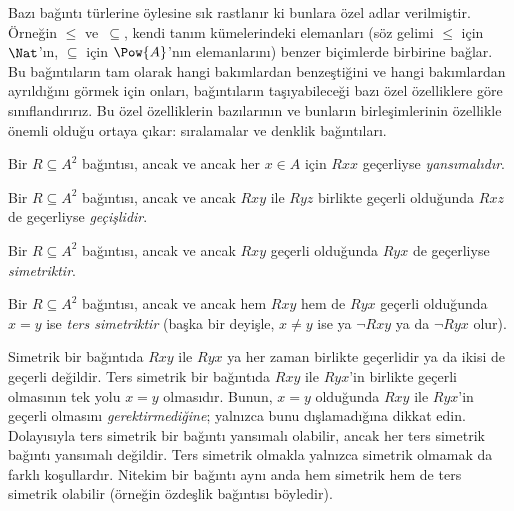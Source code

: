 \documentclass[../../../include/open-logic-section]{subfiles}
\begin{document}

\begin{intro}
Bazı bağıntı türlerine öylesine sık rastlanır ki bunlara özel adlar verilmiştir.
Örneğin $\le$ ve~$\subseteq$, kendi tanım kümelerindeki elemanları (söz gelimi
$\le$ için $\Nat$'ın, $\subseteq$ için $\Pow{A}$'nın elemanlarını) benzer
biçimlerde birbirine bağlar. Bu bağıntıların tam olarak hangi bakımlardan
benzeştiğini ve hangi bakımlardan ayrıldığını görmek için onları, bağıntıların
taşıyabileceği bazı özel özelliklere göre sınıflandırırız. Bu özel özelliklerin
bazılarının ve bunların birleşimlerinin özellikle önemli olduğu ortaya çıkar:
sıralamalar ve denklik bağıntıları.
\end{intro}

\begin{defn}[Yansımalılık]
Bir $R \subseteq A^2$ bağıntısı, ancak ve ancak her $x \in A$ için $Rxx$
geçerliyse \emph{yansımalıdır}.
\end{defn}

\begin{defn}[Geçişlilik]
Bir $R \subseteq A^2$ bağıntısı, ancak ve ancak $Rxy$ ile $Ryz$ birlikte geçerli
olduğunda $Rxz$ de geçerliyse \emph{geçişlidir}.
\end{defn}

\begin{defn}[Simetriklik]
Bir $R \subseteq A^2$ bağıntısı, ancak ve ancak $Rxy$ geçerli olduğunda
$Ryx$ de geçerliyse \emph{simetriktir}.
\end{defn}

\begin{defn}
Bir $R \subseteq A^2$ bağıntısı, ancak ve ancak hem $Rxy$ hem de $Ryx$ geçerli
olduğunda $x=y$ ise \emph{ters simetriktir} (başka bir deyişle,
$x\neq y$ ise ya $\lnot Rxy$ ya da $\lnot Ryx$ olur).
\end{defn}

\begin{explain}
Simetrik bir bağıntıda $Rxy$ ile $Ryx$ ya her zaman birlikte geçerlidir ya da
ikisi de geçerli değildir. Ters simetrik bir bağıntıda $Rxy$ ile $Ryx$'in
birlikte geçerli olmasının tek yolu $x=y$ olmasıdır. Bunun, $x=y$ olduğunda
$Rxy$ ile $Ryx$'in geçerli olmasını \emph{gerektirmediğine}; yalnızca bunu
dışlamadığına dikkat edin. Dolayısıyla ters simetrik bir bağıntı yansımalı
olabilir, ancak her ters simetrik bağıntı yansımalı değildir. Ters simetrik
olmakla yalnızca simetrik olmamak da farklı koşullardır. Nitekim bir bağıntı
aynı anda hem simetrik hem de ters simetrik olabilir (örneğin özdeşlik bağıntısı
böyledir).
\end{explain}
\end{document}
